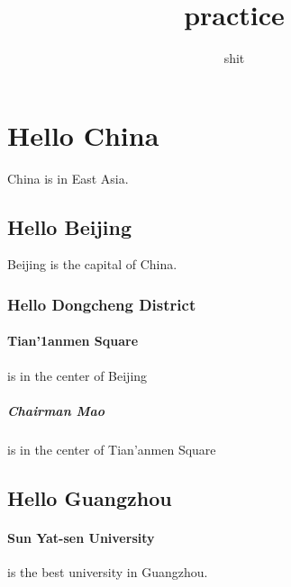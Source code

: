\documentclass{article}
\title{practice}
\author{shit}
\begin{document}
 
  \maketitle 
  \section{Hello China} China is in East Asia. 
    \subsection{Hello Beijing} Beijing is the capital of China. 
      \subsubsection{Hello Dongcheng District} 
        \paragraph{Tian'1anmen Square}is in the center of Beijing 
          \subparagraph{Chairman Mao} is in the center of Tian'anmen Square 
      \subsection{Hello Guangzhou} 
        \paragraph{Sun Yat-sen University} is the best university in Guangzhou. 
\end{document}
